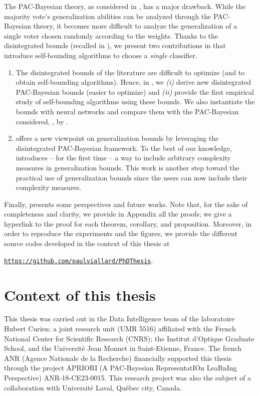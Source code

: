 The PAC-Bayesian theory, as considered in , has a major drawback.
While the majority vote's generalization abilities can be analyzed through the PAC-Bayesian theory, it becomes more difficult to analyze the generalization of a single voter chosen randomly according to the weights.
Thanks to the disintegrated bounds (recalled in ), we present two contributions in  that introduce self-bounding algorithms to choose a {\it single} classifier.

\begin{enumerate}[label={\it (\roman*)}]
  \item The disintegrated bounds of the literature are difficult to optimize (and to obtain self-bounding algorithms). 
  Hence, in , we {\it (i)} derive new disintegrated PAC-Bayesian bounds (easier to optimize) and {\it (ii)} provide the first empirical study of self-bounding algorithms using these bounds.
  We also instantiate the bounds with neural networks and compare them with the PAC-Bayesian considered, \eg, by \citet{DziugaiteRoy2017,ZhouVeitchAusternAdamsOrbanz2019,PerezOrtizRivasplataShaweTaylorSzepesvari2021}.

  \item {} offers a new viewpoint on generalization bounds by leveraging the disintegrated PAC-Bayesian framework.
  To the best of our knowledge,  introduces -- for the first time -- a way to include arbitrary complexity measures in generalization bounds.
  This work is another step toward the practical use of generalization bounds since the users can now include their complexity measures.
\end{enumerate}

Finally,  presents some perspectives and future works.
Note that, for the sake of completeness and clarity, we provide in Appendix all the proofs; we give a hyperlink to the proof for each theorem, corollary, and proposition. 
Moreover, in order to reproduce the experiments and the figures, we provide the different source codes developed in the context of this thesis at
\begin{center}
  \href{https://github.com/paulviallard/PhDThesis}{\tt https://github.com/paulviallard/PhDThesis}.
\end{center}

\section*{Context of this thesis}

This thesis was carried out in the Data Intelligence team of the laboratoire Hubert Curien: a joint research unit (UMR 5516) affiliated with the French National Center for Scientific Research (CNRS); the Institut d'Optique Graduate School, and the Université Jean Monnet in Saint-Etienne, France.
The french ANR (Agence Nationale de la Recherche) financially supported this thesis through the project APRIORI (A PAC-Bayesian RepresentatIOn LeaRnIng Perspective) {\sc ANR-18-CE23-0015}.
This research project was also the subject of a collaboration with Université Laval, Québec city, Canada.